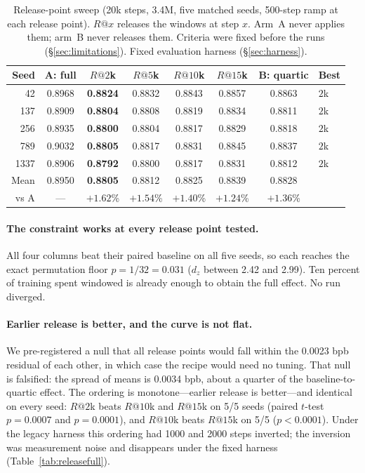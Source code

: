 \documentclass[11pt,a4paper]{article}
\begin{document}
\begin{table}[H]
\centering
\caption{Release-point sweep (20k steps, 3.4M, five matched seeds, 500-step ramp at each release point). $R@x$ releases the windows at step $x$. Arm~A never applies them; arm~B never releases them. Criteria were fixed before the runs (\S\ref{sec:limitations}). Fixed evaluation harness (\S\ref{sec:harness}).}
\label{tab:release}
\begin{tabular}{rccccccl}
\toprule
Seed & A: full & $R@2$k & $R@5$k & $R@10$k & $R@15$k & B: quartic & Best \\
\midrule
42 & 0.8968 & \textbf{0.8824} & 0.8832 & 0.8843 & 0.8857 & 0.8863 & $2$k \\
137 & 0.8909 & \textbf{0.8804} & 0.8808 & 0.8819 & 0.8834 & 0.8811 & $2$k \\
256 & 0.8935 & \textbf{0.8800} & 0.8804 & 0.8817 & 0.8829 & 0.8818 & $2$k \\
789 & 0.9032 & \textbf{0.8805} & 0.8817 & 0.8831 & 0.8845 & 0.8837 & $2$k \\
1337 & 0.8906 & \textbf{0.8792} & 0.8800 & 0.8817 & 0.8831 & 0.8812 & $2$k \\
\midrule
Mean & 0.8950 & \textbf{0.8805} & 0.8812 & 0.8825 & 0.8839 & 0.8828 & \\
vs A & --- & $+1.62$\% & $+1.54$\% & $+1.40$\% & $+1.24$\% & $+1.36$\% & \\
\bottomrule
\end{tabular}
\end{table}

\paragraph{The constraint works at every release point tested.} All four columns beat their paired baseline on all five seeds, so each reaches the exact permutation floor $p=1/32=0.031$ ($d_z$ between 2.42 and 2.99). Ten percent of training spent windowed is already enough to obtain the full effect. No run diverged.

\paragraph{Earlier release is better, and the curve is not flat.} We pre-registered a null that all release points would fall within the 0.0023 bpb residual of each other, in which case the recipe would need no tuning. That null is falsified: the spread of means is 0.0034 bpb, about a quarter of the baseline-to-quartic effect. The ordering is monotone---earlier release is better---and identical on every seed: $R@2$k beats $R@10$k and $R@15$k on 5/5 seeds (paired $t$-test $p=0.0007$ and $p=0.0001$), and $R@10$k beats $R@15$k on 5/5 ($p<0.0001$). Under the legacy harness this ordering had 1000 and 2000 steps inverted; the inversion was measurement noise and disappears under the fixed harness (Table~\ref{tab:releasefull}).
\end{document}
